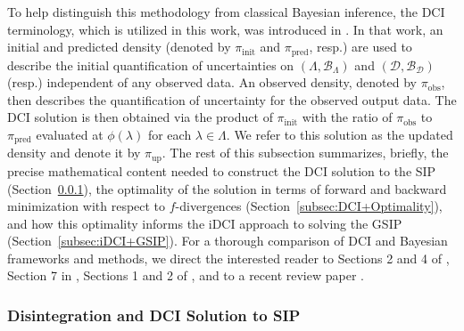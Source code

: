 \documentclass{article}
\newcommand{\pspace}{\Lambda}
\newcommand{\dspace}{\mathcal{D}}
\newcommand{\pborel}{\mathcal{B}_{\pspace}}
\newcommand{\dborel}{\mathcal{B}_{\dspace}}
\newcommand{\initdens}{\pi_{\text{init}}}
\newcommand{\updatedens}{\pi_{\text{up}}}
\newcommand{\predictdens}{\pi_\text{pred}}
\newcommand{\obsdens}{\pi_{\text{obs}}}
\begin{document}
To help distinguish this methodology from classical Bayesian inference, the DCI terminology, which is utilized in this work, was introduced in \cite{BJW18b}.
In that work, an initial and predicted density (denoted by $\initdens$ and $\predictdens$, resp.) are used to describe the initial quantification of uncertainties on $(\pspace,\pborel)$ and $(\dspace,\dborel)$ (resp.) independent of any observed data.
An observed density, denoted by $\obsdens$, then describes the quantification of uncertainty for the observed output data.
The DCI solution is then obtained via the product of $\initdens$ with the ratio of $\obsdens$ to $\predictdens$ evaluated at $\phi(\lambda)$ for each $\lambda\in\pspace$.
We refer to this solution as the updated density and denote it by $\updatedens$.
The rest of this subsection summarizes, briefly, the precise mathematical content needed to construct the DCI solution to the SIP (Section~\ref{subsec:DCI+SIP}), the optimality of the solution in terms of forward and backward minimization with respect to $f$-divergences (Section~\ref{subsec:DCI+Optimality}), and how this optimality informs the iDCI approach to solving the GSIP (Section~\ref{subsec:iDCI+GSIP}).
For a thorough comparison of DCI and Bayesian frameworks and methods, we direct the interested reader to Sections 2 and 4 of \cite{PCT+23}, Section 7 in \cite{BJW18a}, Sections 1 and 2 of \cite{BWY20}, and to a recent review paper \cite{BBE24}.

\subsubsection{Disintegration and DCI Solution to SIP}\label{subsec:DCI+SIP}
\end{document}
